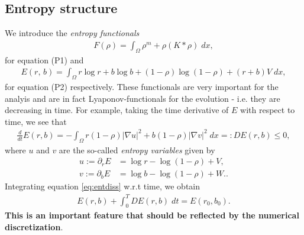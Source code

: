 \documentclass[11pt,a4paper]{article}
\theoremstyle{definition}
\numberwithin{equation}{section}
\newcommand{\rr}[1]{\textcolor{red}{#1}}
\begin{document}
\subsection*{Entropy structure}
We introduce the \emph{entropy functionals}
\begin{align}\label{eq:Eporous}
 F (\rho)=\int_{\Omega} \rho^m + \rho (K\ast \rho)\;dx,
\end{align}
for equation (P1) and 
\begin{align}\label{eq:E}
 E (r,\,b)=\int_{\Omega} r\log r + b\log b + (1-\rho)\log (1-\rho) + (r+b)V\;dx,
\end{align}
for equation (P2) respectively. These functionals are very important for the analyis and are in fact Lyaponov-functionals for the evolution - i.e. they are decreasing in time. 
% 
For example, taking the time derivative of $E$ with respect to time, we see that
\begin{align}\label{eq:entdiss}
 \frac{d}{dt}E(r,b) = - \int_\Omega r(1-\rho)|\nabla u|^2 + b(1-\rho)|\nabla v|^2\;dx =: DE(r,b) \le 0,
\end{align}
where $u$ and $v$ are the so-called \emph{entropy variables} given by 
\begin{align}
  u := \partial_r E  &= \log r - \log(1-\rho) + V, \label{eq:etar} \\
  v := \partial_b E  &= \log b - \log(1-\rho) + W. \label{eq:etab}.
\end{align}
Integrating equation \eqref{eq:entdiss} w.r.t time, we obtain
\begin{align*}
 E(r,b) + \int_0^T DE(r,b)\;dt = E(r_0,b_0).
\end{align*}
\textbf{This is an important feature that should be reflected by the numerical discretization}.
\end{document}
